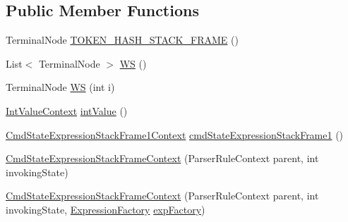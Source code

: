 \subsection*{Public Member Functions}
\begin{DoxyCompactItemize}
\item 
Terminal\+Node \hyperlink{classgov_1_1nasa_1_1jpf_1_1inspector_1_1server_1_1expression_1_1parser_1_1_expression_grammar_pa1661807291671005dea18d81e1943036_a9ef832da5ce58c2afdccb24434396ac1}{T\+O\+K\+E\+N\+\_\+\+H\+A\+S\+H\+\_\+\+S\+T\+A\+C\+K\+\_\+\+F\+R\+A\+ME} ()
\item 
List$<$ Terminal\+Node $>$ \hyperlink{classgov_1_1nasa_1_1jpf_1_1inspector_1_1server_1_1expression_1_1parser_1_1_expression_grammar_pa1661807291671005dea18d81e1943036_adb08861a4c53c87bde3132856b9c4ee4}{WS} ()
\item 
Terminal\+Node \hyperlink{classgov_1_1nasa_1_1jpf_1_1inspector_1_1server_1_1expression_1_1parser_1_1_expression_grammar_pa1661807291671005dea18d81e1943036_a6c79982683445e259e0e062bd68807f3}{WS} (int i)
\item 
\hyperlink{classgov_1_1nasa_1_1jpf_1_1inspector_1_1server_1_1expression_1_1parser_1_1_expression_grammar_parser_1_1_int_value_context}{Int\+Value\+Context} \hyperlink{classgov_1_1nasa_1_1jpf_1_1inspector_1_1server_1_1expression_1_1parser_1_1_expression_grammar_pa1661807291671005dea18d81e1943036_ac7d7dc7fedc45f5be78a0814709a5ce1}{int\+Value} ()
\item 
\hyperlink{classgov_1_1nasa_1_1jpf_1_1inspector_1_1server_1_1expression_1_1parser_1_1_expression_grammar_pabec1adacda521b9e6ed9ea64caf537b4}{Cmd\+State\+Expression\+Stack\+Frame1\+Context} \hyperlink{classgov_1_1nasa_1_1jpf_1_1inspector_1_1server_1_1expression_1_1parser_1_1_expression_grammar_pa1661807291671005dea18d81e1943036_a8fbfe3ac2e9fbbd70f75981a2acf67d9}{cmd\+State\+Expression\+Stack\+Frame1} ()
\item 
\hyperlink{classgov_1_1nasa_1_1jpf_1_1inspector_1_1server_1_1expression_1_1parser_1_1_expression_grammar_pa1661807291671005dea18d81e1943036_a02626f541b2a00c465a1cd0bd748d382}{Cmd\+State\+Expression\+Stack\+Frame\+Context} (Parser\+Rule\+Context parent, int invoking\+State)
\item 
\hyperlink{classgov_1_1nasa_1_1jpf_1_1inspector_1_1server_1_1expression_1_1parser_1_1_expression_grammar_pa1661807291671005dea18d81e1943036_afad7cbe8f94d62b4f2c2e6163d9fde63}{Cmd\+State\+Expression\+Stack\+Frame\+Context} (Parser\+Rule\+Context parent, int invoking\+State, \hyperlink{classgov_1_1nasa_1_1jpf_1_1inspector_1_1server_1_1expression_1_1_expression_factory}{Expression\+Factory} \hyperlink{classgov_1_1nasa_1_1jpf_1_1inspector_1_1server_1_1expression_1_1parser_1_1_expression_grammar_pa1661807291671005dea18d81e1943036_a8d49ae7e265212ebe98b423c6716ca9a}{exp\+Factory})

\end{DoxyCompactItemize}
